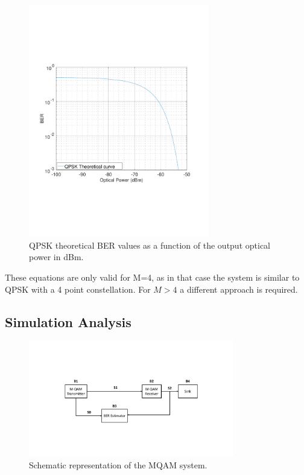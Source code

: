 \begin{figure}[h]
		\centering
		\includegraphics[clip, trim=2cm 6cm 2cm 6cm, width=0.7\textwidth]{./sdf/m_qam_system/figures/BER_QPSK_theory_20180119.pdf}
		\caption{QPSK theoretical BER values as a function of the output optical power in dBm.}
		\label{fig:QPSK_th_curve}
\end{figure}

These equations are only valid for M=4, as in that case the system is similar to QPSK with a 4 point constellation. For $M > 4$ a different approach is required.

\pagebreak
\subsection{Simulation Analysis}

\begin{figure}[h]
	\centering
	\includegraphics[width=0.8\textwidth]{./sdf/m_qam_system/figures/MQAM_system_block_diagram}
	\caption{Schematic representation of the MQAM system.}\label{MQAM_system_block_diagram}
\end{figure}

